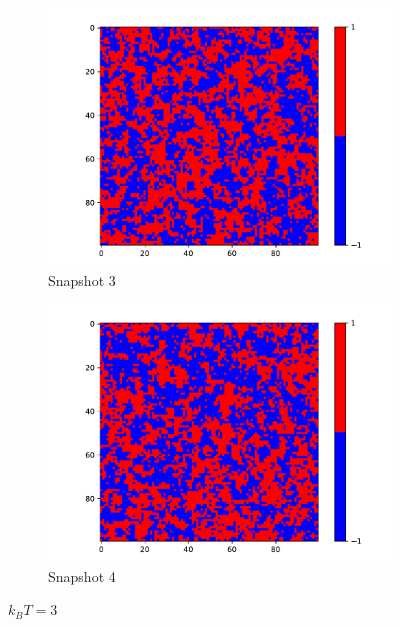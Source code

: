 \begin{figure}
    \begin{subfigure}{0.45\textwidth}
      \centering
      \includegraphics[width=\linewidth]{images/Ising3_3.pdf}
      \caption{Snapshot 3}
      \label{fig:image3}
    \end{subfigure}
    \hfill
    \begin{subfigure}{0.45\textwidth}
      \centering
      \includegraphics[width=\linewidth]{images/Ising3_4.pdf}
      \caption{Snapshot 4}
      \label{fig:image4}
    \end{subfigure}
    \caption{$k_BT = 3$}
    \label{fig:two_by_two}
  \end{figure}